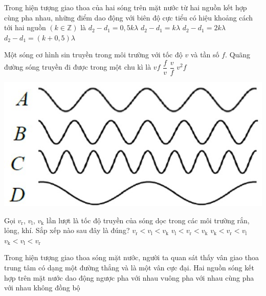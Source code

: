 \begin{ex}
	Trong hiện tượng giao thoa của hai sóng trên mặt nước từ hai nguồn kết hợp cùng pha nhau, những điểm dao động với biên độ cực tiểu có hiệu khoảng cách tới hai nguồn $\left(k\in\mathbb{Z}\right)$ là
	\choice
	{$d_2-d_1=0,5k\lambda$}
	{$d_2-d_1=k\lambda$}
	{$d_2-d_1=2k\lambda$}
	{\True $d_2-d_1=\left(k+0,5\right)\lambda$}
	\loigiai{}
\end{ex}
\begin{ex}
	Một sóng cơ hình sin truyền trong môi trường với tốc độ $v$  và tần số $f$. Quãng đường sóng truyền đi được trong một chu kì là
	\choice
	{$vf$}
	{$\dfrac{f}{v}$}
	{\True $\dfrac{v}{f}$}
	{$v^2f$}
	\loigiai{}
\end{ex}
\begin{ex}
	{\vspace{-0.5cm}\includegraphics[scale=0.4]{../figs/G11-FINAL-SEM1-001-1}}
	\loigiai{}
\end{ex}
\begin{ex}
	Gọi $v_{\mathrm{r}}$, $v_{\mathrm{l}}$, $v_{\mathrm{k}}$  lần lượt là tốc độ truyền của sóng dọc trong các môi trường rắn, lỏng, khí. Sắp xếp nào sau đây là đúng?
	\choice
	{$v_{\mathrm{r}}<v_{\mathrm{l}}<v_{\mathrm{k}}$}
	{$v_{\mathrm{l}}<v_{\mathrm{r}}<v_{\mathrm{k}}$}
	{$v_{\mathrm{k}}<v_{\mathrm{r}}<v_{\mathrm{l}}$}
	{\True $v_{\mathrm{k}}<v_{\mathrm{l}}<v_{\mathrm{r}}$}
	\loigiai{}
\end{ex}
\begin{ex}
	Trong hiện tượng giao thoa sóng mặt nước, người ta quan sát thấy vân giao thoa trung tâm có dạng một đường thẳng và là một vân cực đại. Hai nguồn sóng kết hợp trên mặt nước dao động 
	\choice
	{ngược pha với nhau}
	{vuông pha với nhau}
	{\True cùng pha với nhau}
	{không đồng bộ}
	\loigiai{}
\end{ex}

